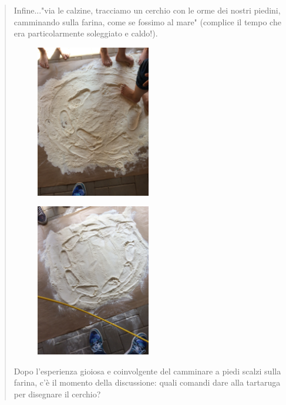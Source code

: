 \begin{quote}

Infine..."via le calzine, tracciamo un cerchio con le orme dei nostri piedini, camminando sulla farina, come se fossimo al mare" (complice il tempo che era particolarmente soleggiato e caldo!).

\begin{minipage}{0.4\textwidth}
\begin{figure}[H]
   \includegraphics[width=5.0cm,trim=4 4 6 4,clip]{./images/cerchio/PiccolomanualeLibreLogo5-img8.jpg}
   \label{cer-9}
\end{figure}
\end{minipage} \hfill
\begin{minipage}{0.4\textwidth}
\begin{figure}[H]
   \includegraphics[width=5.0cm,trim=4 4 6 4,clip]{./images/cerchio/PiccolomanualeLibreLogo5-img9.jpg}
   \label{cer-10}
\end{figure}
\end{minipage} \hfill

Dopo l'esperienza gioiosa e coinvolgente del camminare a piedi scalzi sulla farina, c'è il momento della discussione: quali comandi dare alla tartaruga per disegnare il cerchio?


\end{quote}
